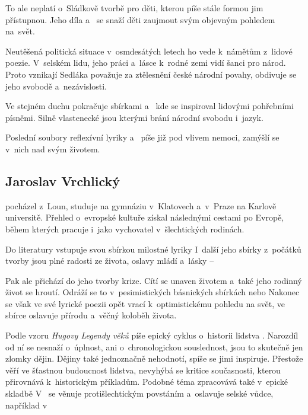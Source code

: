 To ale neplatí o~Sládkově tvorbě pro děti, kterou píše stále formou jim
přístupnou. Jeho díla  
a~ se snaží děti zaujmout svým objevným pohledem
na~svět.

Neutěšená politická situace v~osmdesátých letech ho vede k~námětům
z~lidové poezie. V~selském lidu, jeho práci a~lásce k~rodné zemi vidí
šanci pro národ. Proto vznikají 
Sedláka považuje za ztělesnění české národní povahy, obdivuje se jeho
svobodě a~nezávislosti.

Ve stejném duchu pokračuje sbírkami 
a~ kde se inspiroval lidovými pohřebními písněmi.
Silně vlastenecké jsou  kterými brání národní svobodu
i~jazyk.

Poslední soubory reflexívní lyriky  a~ píše již pod vlivem nemoci, zamýšlí se v~nich nad svým
životem.

\subsection*{Jaroslav Vrchlický}
 pocházel z~Loun, studuje na gymnáziu v~Klatovech
a~v~Praze na Karlově universitě. Přehled o~evropské kultuře získal
následnými cestami po Evropě, během kterých pracuje i~jako vychovatel
v~šlechtických rodinách.

Do literatury vstupuje svou sbírkou milostné lyriky 
I~další jeho sbírky z~počátků tvorby jsou plné radosti ze života, oslavy
mládí a~lásky --  

Pak ale přichází do jeho tvorby krize. Cítí se unaven životem a~také
jeho rodinný život se hroutí. Odráží se to v~pesimistických básnických
sbírkách   nebo  Nakonec se však ve své lyrické poezii opět vrací
k~optimistickému pohledu na svět, ve sbírce  oslavuje
přírodu a~věčný koloběh života.

Podle vzoru \emph{Hugovy Legendy věků} píše epický cyklus o~historii
lidstva . Narozdíl od ní se nesnaží o~úplnost, ani
o~chronologickou souslednost, jsou to skutečně jen zlomky dějin. Dějiny
také jednoznačně nehodnotí, spíše se jimi inspiruje. Přestože věří ve
šťastnou budoucnost lidstva, nevyhýbá se kritice současnosti, kterou
přirovnává k~historickým příkladům. Podobné téma zpracovává také
v~epické skladbě  V~ se
věnuje protišlechtickým povstáním a~oslavuje selské vůdce, například
v~

